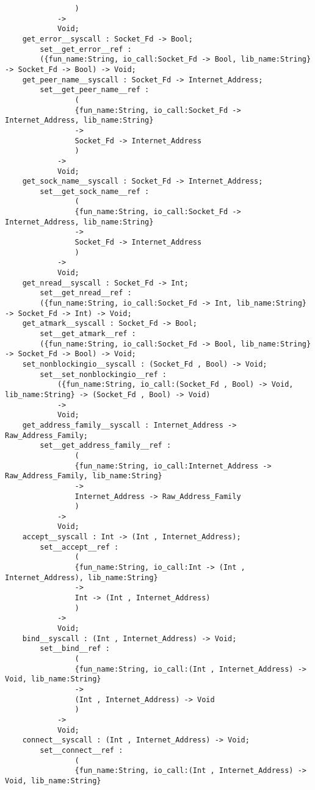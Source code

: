 \begin{verbatim}
                )
            ->
            Void;
    get_error__syscall : Socket_Fd -> Bool;
        set__get_error__ref :
        ({fun_name:String, io_call:Socket_Fd -> Bool, lib_name:String} -> Socket_Fd -> Bool) -> Void;
    get_peer_name__syscall : Socket_Fd -> Internet_Address;
        set__get_peer_name__ref :
                (
                {fun_name:String, io_call:Socket_Fd -> Internet_Address, lib_name:String}
                ->
                Socket_Fd -> Internet_Address
                )
            ->
            Void;
    get_sock_name__syscall : Socket_Fd -> Internet_Address;
        set__get_sock_name__ref :
                (
                {fun_name:String, io_call:Socket_Fd -> Internet_Address, lib_name:String}
                ->
                Socket_Fd -> Internet_Address
                )
            ->
            Void;
    get_nread__syscall : Socket_Fd -> Int;
        set__get_nread__ref :
        ({fun_name:String, io_call:Socket_Fd -> Int, lib_name:String} -> Socket_Fd -> Int) -> Void;
    get_atmark__syscall : Socket_Fd -> Bool;
        set__get_atmark__ref :
        ({fun_name:String, io_call:Socket_Fd -> Bool, lib_name:String} -> Socket_Fd -> Bool) -> Void;
    set_nonblockingio__syscall : (Socket_Fd , Bool) -> Void;
        set__set_nonblockingio__ref :
            ({fun_name:String, io_call:(Socket_Fd , Bool) -> Void, lib_name:String} -> (Socket_Fd , Bool) -> Void)
            ->
            Void;
    get_address_family__syscall : Internet_Address -> Raw_Address_Family;
        set__get_address_family__ref :
                (
                {fun_name:String, io_call:Internet_Address -> Raw_Address_Family, lib_name:String}
                ->
                Internet_Address -> Raw_Address_Family
                )
            ->
            Void;
    accept__syscall : Int -> (Int , Internet_Address);
        set__accept__ref :
                (
                {fun_name:String, io_call:Int -> (Int , Internet_Address), lib_name:String}
                ->
                Int -> (Int , Internet_Address)
                )
            ->
            Void;
    bind__syscall : (Int , Internet_Address) -> Void;
        set__bind__ref :
                (
                {fun_name:String, io_call:(Int , Internet_Address) -> Void, lib_name:String}
                ->
                (Int , Internet_Address) -> Void
                )
            ->
            Void;
    connect__syscall : (Int , Internet_Address) -> Void;
        set__connect__ref :
                (
                {fun_name:String, io_call:(Int , Internet_Address) -> Void, lib_name:String}

\end{verbatim}
